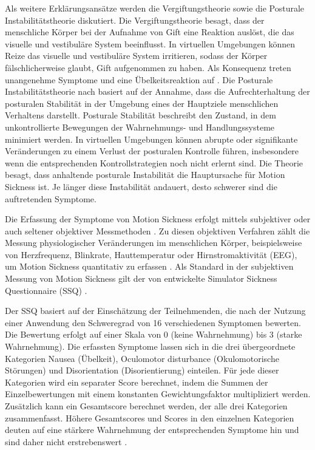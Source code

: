 Als weitere Erklärungsansätze werden die Vergiftungstheorie sowie die Posturale Instabilitätstheorie diskutiert. Die Vergiftungstheorie besagt, dass der menschliche Körper bei der Aufnahme von Gift eine Reaktion auslöst, die das visuelle und vestibuläre System beeinflusst. In virtuellen Umgebungen können Reize das visuelle und vestibuläre System irritieren, sodass der Körper fälschlicherweise glaubt, Gift aufgenommen zu haben. Als Konsequenz treten unangenehme Symptome und eine Übelkeitsreaktion auf \citep{laviola_discussion_2000}. Die Posturale Instabilitätstheorie nach \citet{riccio_ecological_1991} basiert auf der Annahme, dass die Aufrechterhaltung der posturalen Stabilität in der Umgebung eines der Hauptziele menschlichen Verhaltens darstellt. Posturale Stabilität beschreibt den Zustand, in dem unkontrollierte Bewegungen der Wahrnehmungs- und Handlungssysteme minimiert werden. In virtuellen Umgebungen können abrupte oder signifikante Veränderungen zu einem Verlust der posturalen Kontrolle führen, insbesondere wenn die entsprechenden Kontrollstrategien noch nicht erlernt sind. Die Theorie besagt, dass anhaltende posturale Instabilität die Hauptursache für Motion Sickness ist. Je länger diese Instabilität andauert, desto schwerer sind die auftretenden Symptome.

Die Erfassung der Symptome von Motion Sickness erfolgt mittels subjektiver oder auch seltener objektiver Messmethoden \citep{somrak_estimating_2019}. Zu diesen objektiven Verfahren zählt die Messung physiologischer Veränderungen im menschlichen Körper, beispielsweise von Herzfrequenz, Blinkrate, Hauttemperatur oder Hirnstromaktivität (EEG), um Motion Sickness quantitativ zu erfassen \citep{somrak_estimating_2019}. Als Standard in der subjektiven Messung von Motion Sickness gilt der von \citet{kennedy_simulator_1993} entwickelte Simulator Sickness Questionnaire (SSQ) \citep{jerald_vr_2016}.

Der SSQ basiert auf der Einschätzung der Teilnehmenden, die nach der Nutzung einer Anwendung den Schweregrad von 16 verschiedenen Symptomen bewerten. Die Bewertung erfolgt auf einer Skala von 0 (keine Wahrnehmung) bis 3 (starke Wahrnehmung). Die erfassten Symptome lassen sich in die drei übergeordnete Kategorien Nausea (Übelkeit), Oculomotor disturbance (Okulomotorische Störungen) und Disorientation (Disorientierung) einteilen. Für jede dieser Kategorien wird ein separater Score berechnet, indem die Summen der Einzelbewertungen mit einem konstanten Gewichtungsfaktor multipliziert werden. 
Zusätzlich kann ein Gesamtscore berechnet werden, der alle drei Kategorien zusammenfasst. Höhere Gesamtscores und Scores in den einzelnen Kategorien deuten auf eine stärkere Wahrnehmung der entsprechenden Symptome hin und sind daher nicht erstrebenswert \citep{kennedy_simulator_1993}.

